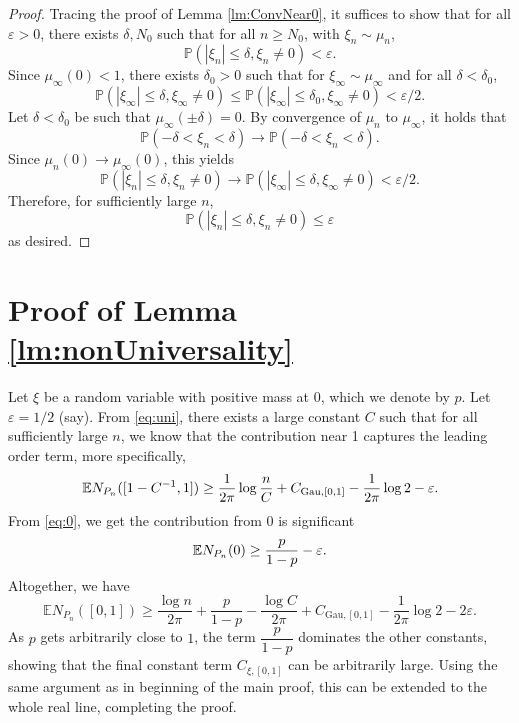 \documentclass[12pt, reqno]{amsart}
\theoremstyle{plain}
\theoremstyle{definition}
\renewcommand\P{{\mathbb{P}}}
\newcommand\E{{\mathbb{E}}}
\newcommand{\ep}{\varepsilon}
\begin{document}
\begin{proof}
	Tracing the proof of Lemma \ref{lm:ConvNear0}, it suffices to show that for all $\varepsilon > 0$, there exists $\delta, N_0$ such that for all $n \ge N_0$, with $\xi_n \sim \mu_n$,
	$$ \P\left( |\xi_n| \le \delta, \xi_n \neq 0 \right) < \varepsilon.$$ 
Since $\mu_\infty(0)<1$, there exists $\delta_0>0$ such that for $\xi_{\infty}\sim \mu_\infty$ and for all $\delta<\delta_0$, 
$$ \P\left( |\xi_\infty| \le \delta, \xi_\infty \neq 0 \right) \le  \P\left( |\xi_\infty| \le \delta_0, \xi_\infty \neq 0 \right) < \varepsilon/2.$$
Let $\delta<\delta_0$ be such that $\mu_\infty(\pm \delta) = 0$.  By convergence of $\mu_n$ to $\mu_\infty$, it holds that
$$\P(-\delta<\xi_n<\delta)\to \P(-\delta<\xi_n<\delta).$$
Since $\mu_n(0)\to \mu_\infty(0)$, this yields
$$ \P\left( |\xi_n| \le \delta, \xi_n \neq 0 \right) \to \P\left( |\xi_\infty| \le \delta, \xi_\infty \neq 0 \right)  < \varepsilon/2.$$
Therefore, for sufficiently large $n$, 
 $$ \P\left( |\xi_n| \le \delta, \xi_n \neq 0 \right) \le \ep$$
 as desired.
\end{proof}


\section{Proof of Lemma \ref{lm:nonUniversality}}\label{prof:nonuni}
 
Let $\xi$ be a random variable with positive mass at 0, which we denote by $p$.
Let $\ep = 1/2$ (say). From \eqref{eq:uni}, there exists a large constant $C$ such that for all sufficiently large $n$, we know that the contribution near 1 captures the leading order term, more specifically, 
\begin{equation}
 \E N_{P_n}([1-C^{-1}, 1]) \ge  \frac{1}{2\pi}\log\frac{n}{C}+ C_{\mathrm{Gau}, [0, 1]}- \frac{1}{2\pi}\log 2 -\ep. \notag
\end{equation}
From \eqref{eq:0}, we get the contribution from $0$ is significant
\begin{equation} 
	\E N_{P_n}(0) \ge \dfrac{p}{1 - p} -\ep.\notag
\end{equation}
Altogether, we have
$$ \E N_{P_n}([0, 1]) \ge  \dfrac{\log n}{2\pi} + \dfrac{p}{1 - p} -\dfrac{\log C}{2\pi} + C_{\mathrm{Gau}, [0, 1]}- \frac{1}{2\pi}\log 2-2\ep.$$
As $p$ gets arbitrarily close to $1$, the term $\dfrac{p}{1 - p}$ dominates the other constants, showing that the final constant term $C_{\xi, [0, 1]}$ can be arbitrarily large. Using the same argument as in beginning of the main proof, this can be extended to the whole real line, completing the proof.
 
\end{document}
